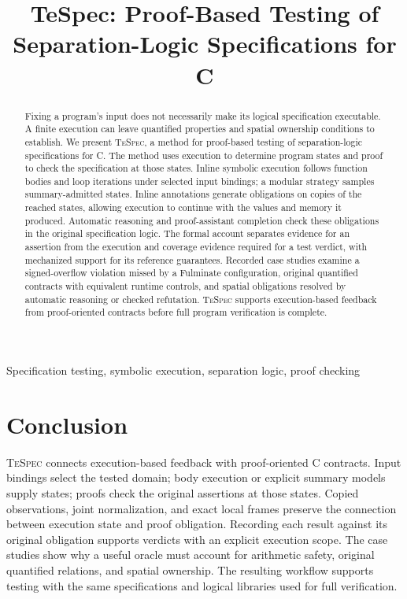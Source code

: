 \documentclass[10pt,conference]{IEEEtran}
\title{TeSpec: Proof-Based Testing of\\Separation-Logic Specifications for C}
\author{\IEEEauthorblockN{Anonymous Authors}}
\newcommand{\tespec}{\textsc{TeSpec}}
\begin{document}
\maketitle
\begin{abstract}
Fixing a program's input does not necessarily make its logical
specification executable. A finite execution can leave quantified
properties and spatial ownership conditions to establish.
We present \tespec{}, a method for proof-based testing of separation-logic
specifications for C. The method uses execution to determine program
states and proof to check the specification at those states.
Inline symbolic execution follows function bodies and loop iterations under
selected input bindings; a modular strategy samples summary-admitted states. Inline annotations generate obligations on copies of
the reached states, allowing execution to continue with the values and
memory it produced. Automatic reasoning and proof-assistant completion
check these obligations in the original specification logic.
The formal account separates evidence for an assertion from the execution
and coverage evidence required for a test verdict, with mechanized support
for its reference guarantees.
Recorded case studies examine a signed-overflow violation missed by a
Fulminate configuration, original quantified contracts with equivalent
runtime controls, and spatial obligations resolved by automatic reasoning
or checked refutation. \tespec{} supports execution-based feedback from
proof-oriented contracts before full program verification is complete.
\end{abstract}
\begin{IEEEkeywords}
Specification testing, symbolic execution, separation logic, proof checking
\end{IEEEkeywords}








\section{Conclusion}
\tespec{} connects execution-based feedback with proof-oriented C contracts.
Input bindings select the tested domain; body execution or explicit summary
models supply states; proofs check the original assertions at those states.
Copied observations, joint normalization, and exact local frames preserve
the connection between execution state and proof obligation. Recording each
result against its original obligation supports verdicts with an explicit
execution scope. The case studies show
why a useful oracle must account for arithmetic safety, original quantified
relations, and spatial ownership. The resulting workflow supports testing
with the same specifications and logical libraries used for full verification.
\end{document}
